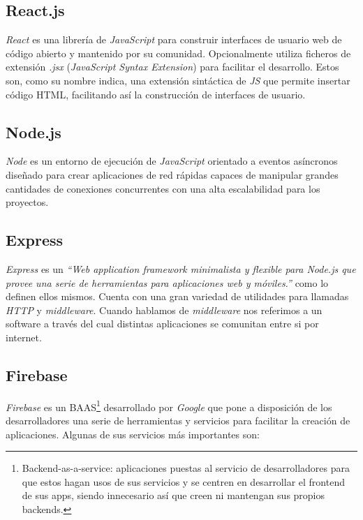 \subsection{React.js}
\textit{React} es una librería de \textit{JavaScript} para construir interfaces de usuario web de código abierto y mantenido por su comunidad. Opcionalmente utiliza ficheros de extensión \textit{.jsx} (\textit{JavaScript Syntax Extension}) para facilitar el desarrollo. Estos son, como su nombre indica, una extensión sintáctica de \textit{JS} que permite insertar código HTML, facilitando así la construcción de interfaces de usuario.

\subsection{Node.js}
\textit{Node}\cite{nodejs} es un entorno de ejecución de \textit{JavaScript} orientado a eventos asíncronos diseñado para crear aplicaciones de red rápidas capaces de manipular grandes cantidades de conexiones concurrentes con una alta escalabilidad para los proyectos.

\subsection{Express}
\textit{Express}\cite{express} es un \textit{``Web application framework minimalista y flexible para Node.js que provee una serie de herramientas para aplicaciones web y móviles.''} como lo definen ellos mismos. Cuenta con una gran variedad de utilidades para llamadas \textit{HTTP} y \textit{middleware}. Cuando hablamos de \textit{middleware} nos referimos a un software a través del cual distintas aplicaciones se comunitan entre si por internet. 

\subsection{Firebase}
\textit{Firebase}\cite{firebase} es un BAAS\footnote{Backend-as-a-service: aplicaciones puestas al servicio de desarrolladores para que estos hagan usos de sus servicios y se centren en desarrollar el frontend de sus apps, siendo innecesario así que creen ni mantengan sus propios backends.} desarrollado por \textit{Google} que pone a disposición de los desarrolladores una serie de herramientas y servicios para facilitar la creación de aplicaciones. Algunas de sus servicios más importantes son:

